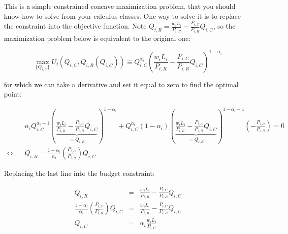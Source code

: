 \documentclass[11pt,letterpaper]{article}
\begin{document}
This is a simple constrained concave maximization problem, that you should know how to solve from your calculus classes. One way to solve it is to replace the constraint into the objective function. Note $Q_{i,R} = \frac{w_i L_i}{P_{i,R}} - \frac{P_{i,C}}{P_{i,R} } Q_{i,C}$, so the maximization problem below is equivalent to the original one:

\begin{equation*}
    \max_{\{Q_{i,C}\}} U_i(Q_{i,C}, Q_{i,R}(Q_{i,C})) \equiv Q_{i,C}^{\alpha_i} \left( \frac{w_i L_i}{P_{i,R}} - \frac{P_{i,C}}{P_{i,R} } Q_{i,C} \right)^{1-\alpha_i}
\end{equation*}

\noindent for which we can take a derivative and set it equal to zero to find the optimal point:

\scriptsize{
\begin{eqnarray*}
    & & \alpha_i Q_{i,C}^{\alpha_i-1} \left( \underbrace{\frac{w_i L_i}{P_{i,R}} - \frac{P_{i,C}}{P_{i,R} } Q_{i,C}}_{=Q_{i,R}} \right)^{1-\alpha_i} + Q_{i,C}^{\alpha_i} (1-\alpha_i) \left( \underbrace{\frac{w_i L_i}{P_{i,R}} - \frac{P_{i,C}}{P_{i,R} } Q_{i,C}}_{=Q_{i,R}} \right)^{1-\alpha_i-1} \left( - \frac{P_{i,C}}{P_{i,R}}\right) = 0 \\
\iff    & & Q_{i,R}  = \frac{1-\alpha_i}{\alpha_i } \left( \frac{P_{i,C}}{P_{i,R}}\right) Q_{i,C}
\end{eqnarray*}
}

\normalsize
Replacing the last line into the budget constraint:

\scriptsize{
\begin{eqnarray*}
    Q_{i,R}&=& \frac{w_i L_i}{P_{i,R}} - \frac{P_{i,C}}{P_{i,R} } Q_{i,C} \\
    \frac{1-\alpha_i}{\alpha_i } \left( \frac{P_{i,C}}{P_{i,R}}\right) Q_{i,C} &=& \frac{w_i L_i}{P_{i,R}} - \frac{P_{i,C}}{P_{i,R} } Q_{i,C} \\
    Q_{i,C} &=& \alpha_i  \frac{w_i L_i}{P_{i,C}}
\end{eqnarray*}

}
\end{document}
